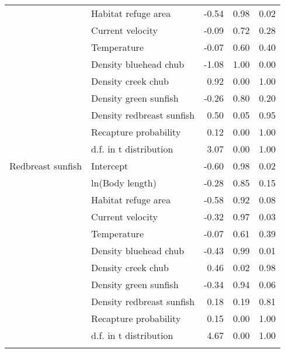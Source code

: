 \begin{longtable}{llrrr}
   & Habitat refuge area & -0.54 & 0.98 & 0.02 \\ 
   & Current velocity & -0.09 & 0.72 & 0.28 \\ 
   & Temperature & -0.07 & 0.60 & 0.40 \\ 
   & Density bluehead chub & -1.08 & 1.00 & 0.00 \\ 
   & Density creek chub & 0.92 & 0.00 & 1.00 \\ 
   & Density green sunfish & -0.26 & 0.80 & 0.20 \\ 
   & Density redbreast sunfish & 0.50 & 0.05 & 0.95 \\ 
   & Recapture probability & 0.12 & 0.00 & 1.00 \\ 
   & d.f. in t distribution & 3.07 & 0.00 & 1.00 \\ 
  Redbreast sunfish & Intercept & -0.60 & 0.98 & 0.02 \\ 
   & ln(Body length) & -0.28 & 0.85 & 0.15 \\ 
   & Habitat refuge area & -0.58 & 0.92 & 0.08 \\ 
   & Current velocity & -0.32 & 0.97 & 0.03 \\ 
   & Temperature & -0.07 & 0.61 & 0.39 \\ 
   & Density bluehead chub & -0.43 & 0.99 & 0.01 \\ 
   & Density creek chub & 0.46 & 0.02 & 0.98 \\ 
   & Density green sunfish & -0.34 & 0.94 & 0.06 \\ 
   & Density redbreast sunfish & 0.18 & 0.19 & 0.81 \\ 
   & Recapture probability & 0.15 & 0.00 & 1.00 \\ 
   & d.f. in t distribution & 4.67 & 0.00 & 1.00 \\ 
   \hline
\hline
\label{tab:coefficients}
\end{longtable}
